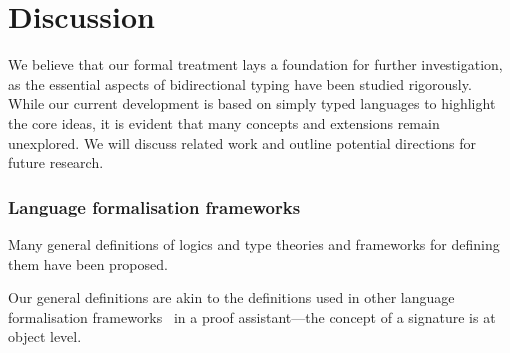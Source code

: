 
\section{Discussion} \label{sec:future}
We believe that our formal treatment lays a foundation for further investigation, as the essential aspects of bidirectional typing have been studied rigorously. 
While our current development is based on simply typed languages to highlight the core ideas, it is evident that many concepts and extensions remain unexplored.
We will discuss related work and outline potential directions for future research.
\subsubsection{Language formalisation frameworks}
Many general definitions of logics and type theories and frameworks for defining them have been proposed.

\citet{Harper1993a,Harper2007}
\cite{Uemura2021}
\cite{Bauer2020,Haselwarter2021,Bauer2022a}
Our general definitions are akin to the definitions used in other language formalisation frameworks~\citep{Ahrens2022,Allais2021,Fiore2022} in a proof assistant---the concept of a signature is at object level.

